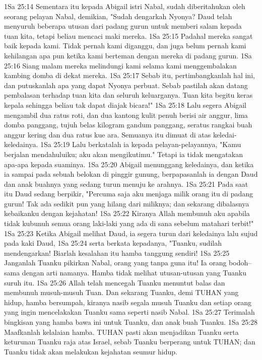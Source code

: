 1Sa 25:14  Sementara itu kepada Abigail istri Nabal, sudah diberitahukan oleh seorang pelayan Nabal, demikian, "Sudah dengarkah Nyonya? Daud telah menyuruh beberapa utusan dari padang gurun untuk memberi salam kepada tuan kita, tetapi beliau mencaci maki mereka.
1Sa 25:15  Padahal mereka sangat baik kepada kami. Tidak pernah kami diganggu, dan juga belum pernah kami kehilangan apa pun ketika kami berteman dengan mereka di padang gurun.
1Sa 25:16  Siang malam mereka melindungi kami selama kami menggembalakan kambing domba di dekat mereka.
1Sa 25:17  Sebab itu, pertimbangkanlah hal ini, dan putuskanlah apa yang dapat Nyonya perbuat. Sebab pastilah akan datang pembalasan terhadap tuan kita dan seluruh keluarganya. Tuan kita begitu keras kepala sehingga beliau tak dapat diajak bicara!"
1Sa 25:18  Lalu segera Abigail mengambil dua ratus roti, dan dua kantong kulit penuh berisi air anggur, lima domba panggang, tujuh belas kilogram gandum panggang, seratus rangkai buah anggur kering dan dua ratus kue ara. Semuanya itu dimuat di atas keledai-keledainya.
1Sa 25:19  Lalu berkatalah ia kepada pelayan-pelayannya, "Kamu berjalan mendahuluiku; aku akan mengikutimu." Tetapi ia tidak mengatakan apa-apa kepada suaminya.
1Sa 25:20  Abigail menunggang keledainya, dan ketika ia sampai pada sebuah belokan di pinggir gunung, berpapasanlah ia dengan Daud dan anak buahnya yang sedang turun menuju ke arahnya.
1Sa 25:21  Pada saat itu Daud sedang berpikir, "Percuma saja aku menjaga milik orang itu di padang gurun! Tak ada sedikit pun yang hilang dari miliknya; dan sekarang dibalasnya kebaikanku dengan kejahatan!
1Sa 25:22  Kiranya Allah membunuh aku apabila tidak kubunuh semua orang laki-laki yang ada di sana sebelum matahari terbit!"
1Sa 25:23  Ketika Abigail melihat Daud, ia segera turun dari keledainya lalu sujud pada kaki Daud,
1Sa 25:24  serta berkata kepadanya, "Tuanku, sudilah mendengarkan! Biarlah kesalahan itu hamba tanggung sendiri!
1Sa 25:25  Janganlah Tuanku pikirkan Nabal, orang yang tanpa guna itu! Ia orang bodoh--sama dengan arti namanya. Hamba tidak melihat utusan-utusan yang Tuanku suruh itu.
1Sa 25:26  Allah telah mencegah Tuanku menuntut balas dan membunuh musuh-musuh Tuan. Dan sekarang Tuanku, demi TUHAN yang hidup, hamba bersumpah, kiranya nasib segala musuh Tuanku dan setiap orang yang ingin mencelakakan Tuanku sama seperti nasib Nabal.
1Sa 25:27  Terimalah bingkisan yang hamba bawa ini untuk Tuanku, dan anak buah Tuanku.
1Sa 25:28  Maafkanlah kelalaian hamba. TUHAN pasti akan menjadikan Tuanku serta keturunan Tuanku raja atas Israel, sebab Tuanku berperang untuk TUHAN; dan Tuanku tidak akan melakukan kejahatan seumur hidup.
